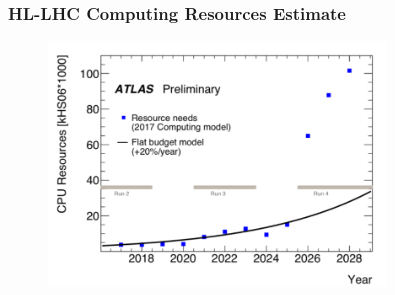 \begin{frame}
\frametitle{HL-LHC Computing Resources Estimate}

\begin{figure}[htbp]
\begin{center}
\includegraphics[width=0.8\textwidth]{images/hllhc-compute-challenges-brief-2.png}
\end{center}
\end{figure}


\end{frame}


